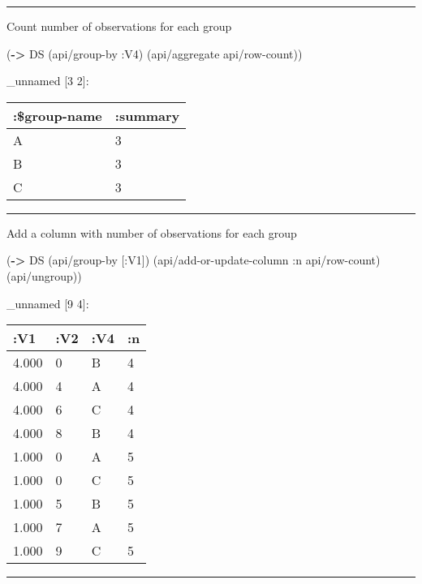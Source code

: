 \documentclass[]{article}
\newenvironment{Shaded}{\begin{snugshade}}{\end{snugshade}}
\newcommand{\KeywordTok}[1]{\textcolor[rgb]{0.13,0.29,0.53}{\textbf{#1}}}
\newcommand{\AttributeTok}[1]{\textcolor[rgb]{0.77,0.63,0.00}{#1}}
\newcommand{\NormalTok}[1]{#1}
\begin{document}
\begin{center}\rule{0.5\linewidth}{0.5pt}\end{center}

Count number of observations for each group

\begin{Shaded}
\begin{Highlighting}[]
\NormalTok{(}\KeywordTok{->}\NormalTok{ DS}
\NormalTok{    (api/group-by }\AttributeTok{:V4}\NormalTok{)}
\NormalTok{    (api/aggregate api/row-count))}
\end{Highlighting}
\end{Shaded}

\_unnamed {[}3 2{]}:

\begin{longtable}[]{@{}ll@{}}
\toprule
:\$group-name & :summary\tabularnewline
\midrule
\endhead
A & 3\tabularnewline
B & 3\tabularnewline
C & 3\tabularnewline
\bottomrule
\end{longtable}

\begin{center}\rule{0.5\linewidth}{0.5pt}\end{center}

Add a column with number of observations for each group

\begin{Shaded}
\begin{Highlighting}[]
\NormalTok{(}\KeywordTok{->}\NormalTok{ DS}
\NormalTok{    (api/group-by [}\AttributeTok{:V1}\NormalTok{])}
\NormalTok{    (api/add-or-update-column }\AttributeTok{:n}\NormalTok{ api/row-count)}
\NormalTok{    (api/ungroup))}
\end{Highlighting}
\end{Shaded}

\_unnamed {[}9 4{]}:

\begin{longtable}[]{@{}llll@{}}
\toprule
:V1 & :V2 & :V4 & :n\tabularnewline
\midrule
\endhead
4.000 & 0 & B & 4\tabularnewline
4.000 & 4 & A & 4\tabularnewline
4.000 & 6 & C & 4\tabularnewline
4.000 & 8 & B & 4\tabularnewline
1.000 & 0 & A & 5\tabularnewline
1.000 & 0 & C & 5\tabularnewline
1.000 & 5 & B & 5\tabularnewline
1.000 & 7 & A & 5\tabularnewline
1.000 & 9 & C & 5\tabularnewline
\bottomrule
\end{longtable}

\begin{center}\rule{0.5\linewidth}{0.5pt}\end{center}
\end{document}
